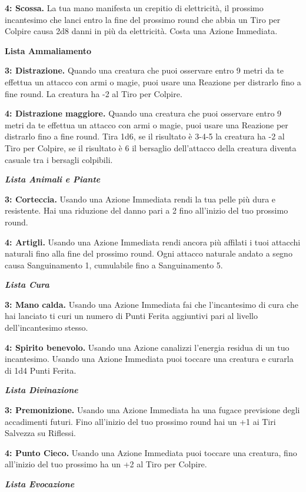 \begin{multicols}{2}
\textbf{4: Scossa.} La tua mano manifesta un crepitio di elettricità, il prossimo incantesimo che lanci entro la fine del prossimo round che abbia un Tiro per Colpire causa 2d8 danni in più da elettricità. Costa una Azione Immediata.

\textbf{Lista Ammaliamento}

\textbf{3: Distrazione.} Quando una creatura che puoi osservare entro 9 metri da te effettua un attacco con armi o magie, puoi usare una Reazione per distrarlo fino a fine round. La creatura ha -2 al Tiro per Colpire.

\textbf{4: Distrazione maggiore.} Quando una creatura che puoi osservare entro 9 metri da te effettua un attacco con armi o magie, puoi usare una Reazione per distrarlo fino a fine round. Tira 1d6, se il risultato è 3-4-5 la creatura ha -2 al Tiro per Colpire, se il risultato è 6 il bersaglio dell'attacco della creatura diventa casuale tra i bersagli colpibili.

\emph{\textbf{Lista Animali e Piante}}

\textbf{3: Corteccia.} Usando una Azione Immediata rendi la tua pelle più dura e resistente. Hai una riduzione del danno pari a 2 fino all'inizio del tuo prossimo round.

\textbf{4: Artigli.} Usando una Azione Immediata rendi ancora più affilati i tuoi attacchi naturali fino alla fine del prossimo round. Ogni attacco naturale andato a segno causa Sanguinamento 1, cumulabile fino a Sanguinamento 5.

\emph{\textbf{Lista Cura}}

\textbf{3: Mano calda.} Usando una Azione Immediata fai che l'incantesimo di cura che hai lanciato ti curi un numero di Punti Ferita aggiuntivi pari al livello dell'incantesimo stesso.

\textbf{4: Spirito benevolo.} Usando una Azione canalizzi l'energia residua di un tuo incantesimo. Usando una Azione Immediata puoi toccare una creatura e curarla di 1d4 Punti Ferita.

\emph{\textbf{Lista Divinazione}}

\textbf{3: Premonizione.} Usando una Azione Immediata ha una fugace previsione degli accadimenti futuri. Fino all'inizio del tuo prossimo round hai un +1 ai Tiri Salvezza su Riflessi.

\textbf{4: Punto Cieco.} Usando una Azione Immediata puoi toccare una creatura, fino all'inizio del tuo prossimo ha un +2 al Tiro per Colpire.

\emph{\textbf{Lista Evocazione}}


\end{multicols}
